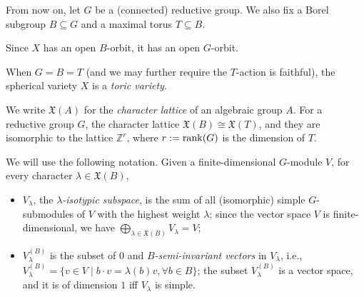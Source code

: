 \newcommand{\ch}{\mathfrak{X}}

From now on, let $G$ be a (connected) reductive group. We also fix a Borel subgroup $B \subseteq G$ and a maximal torus $T \subseteq B$.

\begin{remark*}
	Since $X$ has an open $B$-orbit, it has an open $G$-orbit.
\end{remark*}

\begin{example}
	When $G = B = T$ (and we may further require the $T$-action is faithful), the spherical variety $X$ is a \emph{toric variety}.
\end{example}

We write $\ch(A)$ for the \emph{character lattice} of an algebraic group $A$. For a reductive group $G$, the character lattice $\ch(B) \cong \ch(T)$, and they are isomorphic to the lattice $\mathbb{Z}^r$, where $r := \mathrm{rank}(G)$ is the dimension of $T$.





We will use the following notation. Given a finite-dimensional $G$-module $V$, for every character $\lambda \in \ch(B)$,
\begin{itemize}
	\item $V_\lambda$, the \emph{$\lambda$-isotypic subspace}, is the sum of all (isomorphic) simple $G$-submodules of $V$ with the highest weight $\lambda$; since the vector space $V$ is finite-dimensional, we have $\bigoplus_{\lambda \in \ch(B)} V_\lambda = V$;

	\item $V_\lambda^{(B)}$ is the subset of $0$ and \emph{$B$-semi-invariant vectors} in $V_\lambda$, i.e., $V_\lambda^{(B)} = \{v \in V \mid b \cdot v = \lambda(b) v, \forall b \in B\}$; the subset $V_\lambda^{(B)}$ is a vector space, and it is of dimension $1$ iff $V_\lambda$ is simple.
\end{itemize}

